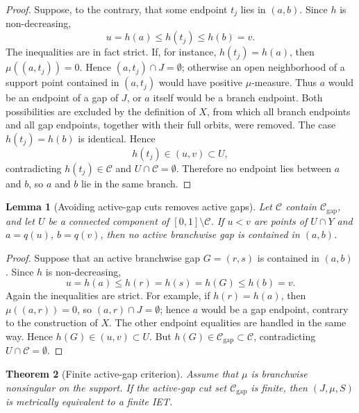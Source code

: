 \documentclass[11pt]{amsart}
\theoremstyle{plain}
\newtheorem{theorem}{Theorem}[section]
\newtheorem{lemma}[theorem]{Lemma}
\theoremstyle{definition}
\theoremstyle{remark}
\newcommand{\cC}{\mathcal C}
\begin{document}
\begin{proof}
Suppose, to the contrary, that some endpoint $t_j$ lies in $(a,b)$. Since $h$ is non-decreasing,
\[
        u=h(a)\le h(t_j)\le h(b)=v.
\]
The inequalities are in fact strict. If, for instance, $h(t_j)=h(a)$, then $\mu((a,t_j))=0$. Hence $(a,t_j)\cap J=\emptyset$; otherwise an open neighborhood of a support point contained in $(a,t_j)$ would have positive $\mu$-measure. Thus $a$ would be an endpoint of a gap of $J$, or $a$ itself would be a branch endpoint. Both possibilities are excluded by the definition of $X$, from which all branch endpoints and all gap endpoints, together with their full orbits, were removed. The case $h(t_j)=h(b)$ is identical. Hence
\[
        h(t_j)\in(u,v)\subset U,
\]
contradicting $h(t_j)\in\cC$ and $U\cap\cC=\emptyset$. Therefore no endpoint lies between $a$ and $b$, so $a$ and $b$ lie in the same branch.
\end{proof}

\begin{lemma}[Avoiding active-gap cuts removes active gaps]\label{lem:avoid-active-cuts}
Let $\cC$ contain $\cC_{\mathrm{gap}}$, and let $U$ be a connected component of $[0,1]\setminus\cC$. If $u<v$ are points of $U\cap Y$ and $a=q(u)$, $b=q(v)$, then no active branchwise gap is contained in $(a,b)$.
\end{lemma}

\begin{proof}
Suppose that an active branchwise gap $G=(r,s)$ is contained in $(a,b)$. Since $h$ is non-decreasing,
\[
        u=h(a)\le h(r)=h(s)=h(G)\le h(b)=v.
\]
Again the inequalities are strict. For example, if $h(r)=h(a)$, then $\mu((a,r))=0$, so $(a,r)\cap J=\emptyset$; hence $a$ would be a gap endpoint, contrary to the construction of $X$. The other endpoint equalities are handled in the same way. Hence $h(G)\in(u,v)\subset U$. But $h(G)\in\cC_{\mathrm{gap}}\subset\cC$, contradicting $U\cap\cC=\emptyset$.
\end{proof}

\begin{theorem}[Finite active-gap criterion]\label{thm:finite-active-gap}
Assume that $\mu$ is branchwise nonsingular on the support. If the active-gap cut set $\cC_{\mathrm{gap}}$ is finite, then $(J,\mu,S)$ is metrically equivalent to a finite IET.
\end{theorem}
\end{document}
